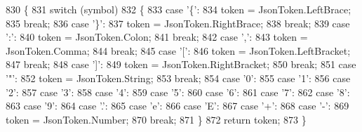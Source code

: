 \begin{DoxyCode}
830         \{
831             \textcolor{keywordflow}{switch} (symbol)
832             \{
833                 \textcolor{keywordflow}{case} \textcolor{charliteral}{'\{'}:
834                     token = JsonToken.LeftBrace;
835                     \textcolor{keywordflow}{break};
836                 \textcolor{keywordflow}{case} \textcolor{charliteral}{'\}'}:
837                     token = JsonToken.RightBrace;
838                     \textcolor{keywordflow}{break};
839                 \textcolor{keywordflow}{case} \textcolor{charliteral}{':'}:
840                     token = JsonToken.Colon;
841                     \textcolor{keywordflow}{break};
842                 \textcolor{keywordflow}{case} \textcolor{charliteral}{','}:
843                     token = JsonToken.Comma;
844                     \textcolor{keywordflow}{break};
845                 \textcolor{keywordflow}{case} \textcolor{charliteral}{'['}:
846                     token = JsonToken.LeftBracket;
847                     \textcolor{keywordflow}{break};
848                 \textcolor{keywordflow}{case} \textcolor{charliteral}{']'}:
849                     token = JsonToken.RightBracket;
850                     \textcolor{keywordflow}{break};
851                 \textcolor{keywordflow}{case} \textcolor{charliteral}{'"'}:
852                     token = JsonToken.String;
853                     \textcolor{keywordflow}{break};
854                 \textcolor{keywordflow}{case} \textcolor{charliteral}{'0'}:
855                 \textcolor{keywordflow}{case} \textcolor{charliteral}{'1'}:
856                 \textcolor{keywordflow}{case} \textcolor{charliteral}{'2'}:
857                 \textcolor{keywordflow}{case} \textcolor{charliteral}{'3'}:
858                 \textcolor{keywordflow}{case} \textcolor{charliteral}{'4'}:
859                 \textcolor{keywordflow}{case} \textcolor{charliteral}{'5'}:
860                 \textcolor{keywordflow}{case} \textcolor{charliteral}{'6'}:
861                 \textcolor{keywordflow}{case} \textcolor{charliteral}{'7'}:
862                 \textcolor{keywordflow}{case} \textcolor{charliteral}{'8'}:
863                 \textcolor{keywordflow}{case} \textcolor{charliteral}{'9'}:
864                 \textcolor{keywordflow}{case} \textcolor{charliteral}{'.'}:
865                 \textcolor{keywordflow}{case} \textcolor{charliteral}{'e'}:
866                 \textcolor{keywordflow}{case} \textcolor{charliteral}{'E'}:
867                 \textcolor{keywordflow}{case} \textcolor{charliteral}{'+'}:
868                 \textcolor{keywordflow}{case} \textcolor{charliteral}{'-'}:
869                     token = JsonToken.Number;
870                     \textcolor{keywordflow}{break};
871             \}
872             \textcolor{keywordflow}{return} token;
873         \}
\end{DoxyCode}
